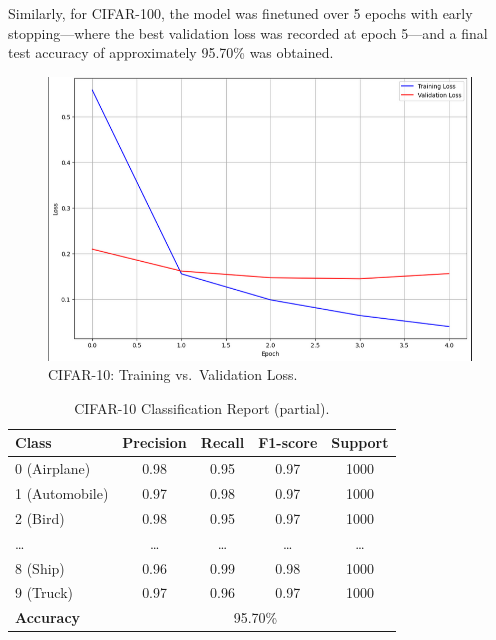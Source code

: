 \documentclass[conference]{IEEEtran}
\begin{document}
Similarly, for CIFAR-100, the model was finetuned over 5 epochs with early
stopping—where the best validation loss was recorded at epoch 5—and a final
test accuracy of approximately 95.70\% was obtained.

\begin{figure}[H]
    \centering
    \includegraphics[width=0.55\linewidth]{cifar10_train_val_loss.png}
    \caption{CIFAR-10: Training vs.\ Validation Loss.}
    \label{fig:cifar10_loss}
\end{figure}

\begin{table}[H]
    \centering
    \scriptsize
    \begin{tabular}{lcccc}
        \toprule
        \textbf{Class}    & \textbf{Precision}          & \textbf{Recall} & \textbf{F1-score} & \textbf{Support} \\
        \midrule
        0 (Airplane)      & 0.98                        & 0.95            & 0.97              & 1000             \\
        1 (Automobile)    & 0.97                        & 0.98            & 0.97              & 1000             \\
        2 (Bird)          & 0.98                        & 0.95            & 0.97              & 1000             \\
        \ldots            & \ldots                      & \ldots          & \ldots            & \ldots           \\
        8 (Ship)          & 0.96                        & 0.99            & 0.98              & 1000             \\
        9 (Truck)         & 0.97                        & 0.96            & 0.97              & 1000             \\
        \midrule
        \textbf{Accuracy} & \multicolumn{4}{c}{95.70\%}                                                          \\
        \bottomrule
    \end{tabular}
    \caption{CIFAR-10 Classification Report (partial).}
    \label{tab:cifar10_report}
\end{table}
\end{document}

